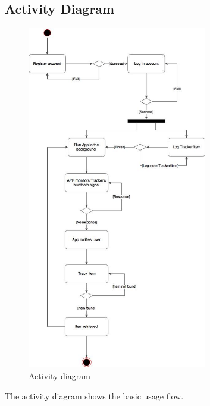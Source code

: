\documentclass[12pt,a4paper]{article}
\begin{document}
        \subsection{Activity Diagram}
          \begin{figure}[H]
            \centering
            \includegraphics[width=0.7\textwidth]{assets/5-activity-diagram.jpg}
            \caption{Activity diagram}
            \label{fig:Activity diagram}
          \end{figure}
          The activity diagram shows the basic usage flow.
\end{document}
